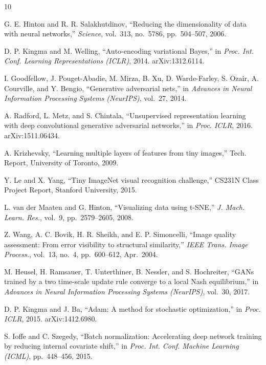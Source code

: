 \documentclass[12pt]{article}
\begin{document}
\begin{thebibliography}{10}

G. E. Hinton and R. R. Salakhutdinov,
``Reducing the dimensionality of data with neural networks,''
\textit{Science}, vol.\ 313, no.\ 5786, pp.\ 504--507, 2006.

D. P. Kingma and M. Welling,
``Auto-encoding variational Bayes,''
in \textit{Proc. Int. Conf. Learning Representations (ICLR)}, 2014.
arXiv:1312.6114.

I. Goodfellow, J. Pouget-Abadie, M. Mirza, B. Xu, D. Warde-Farley, S. Ozair, A. Courville, and Y. Bengio,
``Generative adversarial nets,''
in \textit{Advances in Neural Information Processing Systems (NeurIPS)}, vol.\ 27, 2014.

A. Radford, L. Metz, and S. Chintala,
``Unsupervised representation learning with deep convolutional generative adversarial networks,''
in \textit{Proc. ICLR}, 2016.
arXiv:1511.06434.

A. Krizhevsky,
``Learning multiple layers of features from tiny images,''
Tech. Report, University of Toronto, 2009.

Y. Le and X. Yang,
``Tiny ImageNet visual recognition challenge,''
CS231N Class Project Report, Stanford University, 2015.

L. van der Maaten and G. Hinton,
``Visualizing data using t-SNE,''
\textit{J. Mach. Learn. Res.}, vol.\ 9, pp.\ 2579--2605, 2008.

Z. Wang, A. C. Bovik, H. R. Sheikh, and E. P. Simoncelli,
``Image quality assessment: From error visibility to structural similarity,''
\textit{IEEE Trans. Image Process.}, vol.\ 13, no.\ 4, pp.\ 600--612, Apr.\ 2004.

M. Heusel, H. Ramsauer, T. Unterthiner, B. Nessler, and S. Hochreiter,
``GANs trained by a two time-scale update rule converge to a local Nash equilibrium,''
in \textit{Advances in Neural Information Processing Systems (NeurIPS)}, vol.\ 30, 2017.

D. P. Kingma and J. Ba,
``Adam: A method for stochastic optimization,''
in \textit{Proc. ICLR}, 2015.
arXiv:1412.6980.

S. Ioffe and C. Szegedy,
``Batch normalization: Accelerating deep network training by reducing internal covariate shift,''
in \textit{Proc. Int. Conf. Machine Learning (ICML)}, pp.\ 448--456, 2015.

\end{thebibliography}
\end{document}

